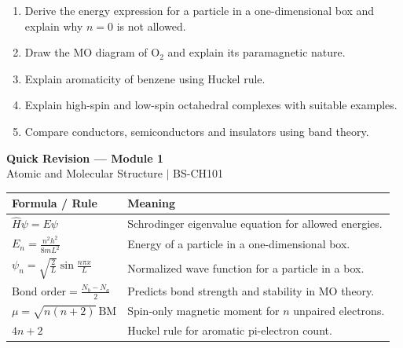 \documentclass[12pt,a4paper]{article}
\begin{document}
\begin{tcolorbox}[masonbox, title={Previous-Year Style Questions}]
\begin{enumerate}[leftmargin=*, itemsep=4pt, topsep=2pt]
  \item Derive the energy expression for a particle in a one-dimensional box and explain why $n=0$ is not allowed.
  \item Draw the MO diagram of $\mathrm{O_2}$ and explain its paramagnetic nature.
  \item Explain aromaticity of benzene using Huckel rule.
  \item Explain high-spin and low-spin octahedral complexes with suitable examples.
  \item Compare conductors, semiconductors and insulators using band theory.
\end{enumerate}
\end{tcolorbox}
\newpage
\begin{center}
  {\large\bfseries\color{myred} Quick Revision --- Module 1}\\[3pt]
  {\small\color{mydark} Atomic and Molecular Structure $|$ BS-CH101}
\end{center}
\noindent{\color{myred}\rule{\linewidth}{1.2pt}}
\vspace{4pt}

\begin{tcolorbox}[formulabox, title={Key Formulas at a Glance}]
\begin{tabularx}{\linewidth}{|B{4.0cm}|Y|}
\hline
\textbf{Formula / Rule} & \textbf{Meaning} \\
\hline
$\hat{H}\psi=E\psi$ & Schrodinger eigenvalue equation for allowed energies. \\
\hline
$E_n=\displaystyle\frac{n^2h^2}{8mL^2}$ & Energy of a particle in a one-dimensional box. \\
\hline
$\psi_n=\sqrt{\displaystyle\frac{2}{L}}\sin\displaystyle\frac{n\pi x}{L}$ & Normalized wave function for a particle in a box. \\
\hline
$\text{Bond order}=\displaystyle\frac{N_b-N_a}{2}$ & Predicts bond strength and stability in MO theory. \\
\hline
$\mu=\sqrt{n(n+2)}\ \mathrm{BM}$ & Spin-only magnetic moment for $n$ unpaired electrons. \\
\hline
$4n+2$ & Huckel rule for aromatic pi-electron count. \\
\hline
\end{tabularx}
\end{tcolorbox}
\end{document}
